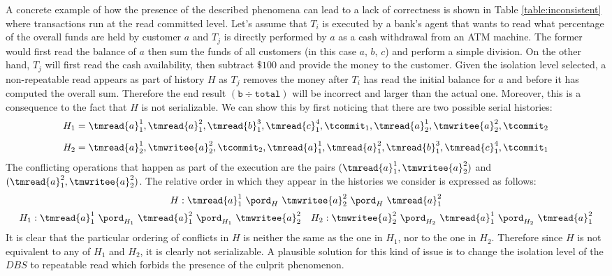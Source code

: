 A concrete example of how the presence of the described phenomena can lead to a lack of correctness is shown in Table \ref{table:inconsistent} where transactions run at the read committed level. Let's assume that $T_i$ is executed by a bank's agent that wants to read what percentage of the overall funds are held by customer $a$ and $T_j$ is directly performed by $a$ as a cash withdrawal from an ATM machine. The former would first read the balance of $a$ then sum the funds of all customers (in this case $a$, $b$, $c$) and perform a simple division. On the other hand, $T_j$ will first read the cash availability, then subtract $\$100$ and provide the money to the customer. Given the isolation level selected, a non-repeatable read appears as part of history $H$ as $T_j$ removes the money after $T_i$ has read the initial balance for $a$ and before it has computed the overall sum. Therefore the end result $(\texttt{b}\div\texttt{total})$ will be incorrect and larger than the actual one. Moreover, this is a consequence to the fact that $H$ is not serializable. We can show this by first noticing that there are two possible serial histories:
\begin{align*}
	H_1 &= \tmread{a}_1^1, \tmread{a}_1^2, \tmread{b}_1^3, \tmread{c}_1^4, \tcommit_1, \tmread{a}_2^1, \tmwritee{a}_2^2, \tcommit_2 \\[0.5em]
	H_2 &= \tmread{a}_2^1, \tmwritee{a}_2^2, \tcommit_2, \tmread{a}_1^1, \tmread{a}_1^2, \tmread{b}_1^3, \tmread{c}_1^4, \tcommit_1
\end{align*}
The conflicting operations that happen as part of the execution are the pairs $(\tmread{a}_1^1, \tmwritee{a}_2^2)$ and $(\tmread{a}_1^2, \tmwritee{a}_2^2)$. The relative order in which they appear in the histories we consider is expressed as follows:
\[
	\begin{array}{c}
		H: \tmread{a}_1^1\ \pord_H\ \tmwritee{a}_2^2\ \pord_H\ \tmread{a}_1^2
		\\[0.5em]
		\begin{array}{c c}
			H_1 : \tmread{a}_1^1\ \pord_{H_1}\ \tmread{a}_1^2\ \pord_{H_1}\ \tmwritee{a}_2^2
			&
			H_2 : \tmwritee{a}_2^2\ \pord_{H_2}\ \tmread{a}_1^1\ \pord_{H_2}\ \tmread{a}_1^2
		\end{array}
	\end{array}
\]
It is clear that the particular ordering of conflicts in $H$ is neither the same as the one in $H_1$, nor to the one in $H_2$. Therefore since $H$ is not equivalent to any of $H_1$ and $H_2$, it is clearly not serializable. A plausible solution for this kind of issue is to change the isolation level of the $DBS$ to repeatable read which forbids the presence of the culprit phenomenon.
